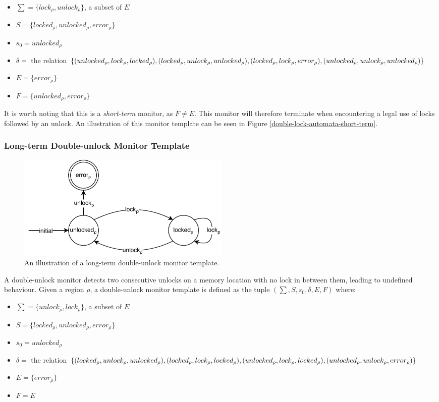 \begin{itemize}
    \item $\sum = \{lock_\rho, unlock_\rho\}$, a subset of $E$
    \item $S = \{ locked_\rho, unlocked_\rho, error_\rho \}$
    \item $s_0 = unlocked_\rho$ 
    \item $\delta =$ the relation $\{(unlocked_\rho, lock_\rho, locked_\rho), (locked_\rho, unlock_\rho, unlocked_\rho), \\
    (locked_\rho, lock_\rho, error_\rho), (unlocked_\rho, unlock_\rho, unlocked_\rho)\}$ 
    \item $E = \{ error_\rho \}$  
    \item $F = \{ unlocked_\rho, error_\rho \}$
\end{itemize}

\noindent It is worth noting that this is a \textit{short-term} monitor, as $F \neq E$. This monitor will therefore terminate when encountering a legal use of locks followed by an unlock. An illustration of this monitor template can be seen in Figure \ref{double-lock-automata-short-term}. 

\subsubsection*{Long-term Double-unlock Monitor Template}

\begin{figure}[H]
    \centering
    \includegraphics[width=0.5\textwidth]{algorithm/figures/double-unlock}
    \caption{An illustration of a long-term double-unlock monitor template.}
    \label{double-unlock-automata}
\end{figure}

A double-unlock monitor detects two consecutive unlocks on a memory location with no lock in between them, leading to undefined behaviour. Given a region $\rho$, a double-unlock monitor template is defined as the tuple $(\sum, S, s_0, \delta, E, F)$ where: 

\begin{itemize}
    \item $\sum = \{unlock_\rho, lock_\rho\}$, a subset of $E$
    \item $S = \{ locked_\rho, unlocked_\rho, error_\rho \}$
    \item $s_0 = unlocked_\rho$ 
    \item $\delta =$ the relation $\{(locked_\rho, unlock_\rho, unlocked_\rho), (locked_\rho, lock_\rho, locked_\rho), \\
        (unlocked_\rho, lock_\rho, locked_\rho), (unlocked_\rho, unlock_\rho, error_\rho)\}$ 
    \item $E = \{ error_\rho \}$
    \item $F = E$
\end{itemize}

